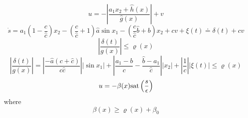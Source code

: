 \begin{equation}
        u = -\left \vert \frac{a_1 x_2 + \hat{h}(x)}{\hat{g}(x)} \right\vert + v
\end{equation}
\begin{equation}
        \dot{s} = a_1\left(1 - \frac{c}{\hat{c}}\right) x_2 - \left(\frac{c}{\hat{c}} + 1\right)\hat{a} \sin x_1 - \left(\frac{c}{\hat{c}}\hat{b} + b\right) x_2 + cv + \xi(t) \doteq \delta(t) + cv
\end{equation}
\begin{equation}
        \left \vert \frac{\delta(t)}{g(x)} \right\vert \leq \varrho(x)
\end{equation}
\begin{equation}
        \left \vert \frac{\delta(t)}{g(x)} \right\vert = \left \vert \frac{-\hat{a}(c+\hat{c})}{c\hat{c}} \right \vert \vert \sin x_1 \vert + \left \vert \frac{a_1 - b}{c} - \frac{\hat{b} - a_1}{\hat{c}} \right \vert \vert x_2 \vert + \left\vert \frac{1}{c}\right\vert \left\vert \xi(t) \right\vert \leq \varrho(x)
\end{equation}
\begin{equation}
        u = -\beta(x)\mathrm{sat}\left(\frac{s}{\epsilon}\right)
\end{equation}
where
\begin{equation}
        \beta(x) \geq \varrho(x) + \beta_0
\end{equation}



